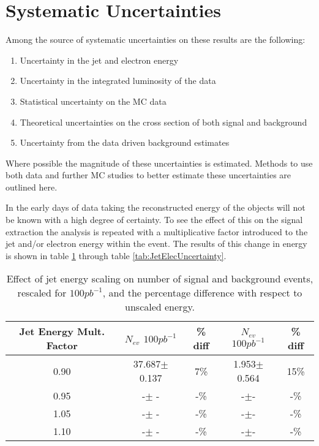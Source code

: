 % 

\section{Systematic Uncertainties} \label{sec:Systematics}

Among the source of systematic uncertainties on these results are the following:
%
\begin{enumerate}
\item Uncertainty in the jet and electron energy 
\item Uncertainty in the integrated luminosity of the data
\item Statistical uncertainty on the MC data
\item Theoretical uncertainties on the cross section of both signal and background
\item Uncertainty from the data driven background estimates
\end{enumerate}
%
Where possible the magnitude of these uncertainties is estimated.   Methods to use both data and further MC studies to better estimate these uncertainties are outlined here.

In the early days of data taking the reconstructed energy of the objects will not be known with a high degree of certainty.  To see the effect of this on the signal extraction the analysis 
is repeated with a multiplicative factor introduced to the jet and/or electron energy within the event.  The results of this change in energy is shown in table \ref{tab:JetUncertainty} 
through table  \ref{tab:JetElecUncertainty}. 

\begin{table}[htbp]
\begin{center}
\begin{tabular}{|c|c|c|c|c|}
\hline
\hline
Jet Energy Mult. Factor & $N_{ev}$ $100pb^{-1}$ & \% diff & $N_{ev}$ $100pb^{-1}$ & \% diff  \\
\hline
\hline
0.90 & 37.687$\pm$ 0.137& 7\% &1.953$\pm$0.564& 15\% \\
\hline
0.95 & -$\pm$ -& -\% &-$\pm$-& -\% \\
\hline
1.05 & -$\pm$ -& -\% &-$\pm$-&-\% \\
\hline
1.10 & -$\pm$ -& -\% &-$\pm$-& -\% \\
\hline

\hline
\end{tabular}
\end{center}
\caption{Effect of jet energy scaling on number of signal and background events, rescaled for $100 pb^{-1}$, and the percentage difference with respect to unscaled energy.}
\label{tab:JetUncertainty}
\end{table}


